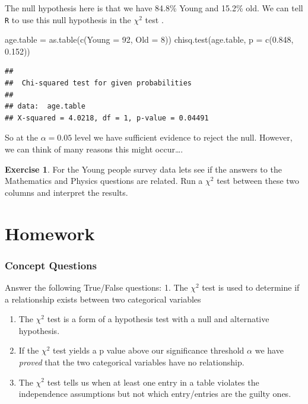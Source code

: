 \documentclass[
]{book}
\newenvironment{Shaded}{\begin{snugshade}}{\end{snugshade}}
\newcommand{\AttributeTok}[1]{\textcolor[rgb]{0.77,0.63,0.00}{#1}}
\newcommand{\DecValTok}[1]{\textcolor[rgb]{0.00,0.00,0.81}{#1}}
\newcommand{\FloatTok}[1]{\textcolor[rgb]{0.00,0.00,0.81}{#1}}
\newcommand{\FunctionTok}[1]{\textcolor[rgb]{0.00,0.00,0.00}{#1}}
\newcommand{\NormalTok}[1]{#1}
\newcommand{\OtherTok}[1]{\textcolor[rgb]{0.56,0.35,0.01}{#1}}
\theoremstyle{definition}
\theoremstyle{definition}
\theoremstyle{definition}
\newtheorem{exercise}{Exercise}[chapter]
\theoremstyle{definition}
\theoremstyle{remark}
\begin{document}
The null hypothesis here is that we have 84.8\% Young and 15.2\% old. We can tell \texttt{R} to use this null hypothesis in the \(\chi^2\) test .

\begin{Shaded}
\begin{Highlighting}[]
\NormalTok{age.table }\OtherTok{=} \FunctionTok{as.table}\NormalTok{(}\FunctionTok{c}\NormalTok{(}\AttributeTok{Young =} \DecValTok{92}\NormalTok{, }\AttributeTok{Old =} \DecValTok{8}\NormalTok{))}
\FunctionTok{chisq.test}\NormalTok{(age.table, }\AttributeTok{p =} \FunctionTok{c}\NormalTok{(}\FloatTok{0.848}\NormalTok{, }\FloatTok{0.152}\NormalTok{))}
\end{Highlighting}
\end{Shaded}

\begin{verbatim}
## 
##  Chi-squared test for given probabilities
## 
## data:  age.table
## X-squared = 4.0218, df = 1, p-value = 0.04491
\end{verbatim}

So at the \(\alpha=0.05\) level we have sufficient evidence to reject the null. However, we can think of many reasons this might occur\ldots.

\begin{exercise}
\protect\hypertarget{exr:unnamed-chunk-600}{}\label{exr:unnamed-chunk-600}For the Young people survey data lets see if the answers to the Mathematics and Physics questions are related. Run a \(\chi^2\) test between these two columns and interpret the results.
\end{exercise}

\hypertarget{homework-14}{%
\section{Homework}\label{homework-14}}

\hypertarget{concept-questions-13}{%
\subsubsection{Concept Questions}\label{concept-questions-13}}

Answer the following True/False questions:
1. The \(\chi^2\) test is used to determine if a relationship exists between two categorical variables

\begin{enumerate}
\def\labelenumi{\arabic{enumi}.}
\setcounter{enumi}{1}
\item
  The \(\chi^2\) test is a form of a hypothesis test with a null and alternative hypothesis.
\item
  If the \(\chi^2\) test yields a p value above our significance threshold \(\alpha\) we have \emph{proved} that the two categorical variables have no relationship.
\item
  The \(\chi^2\) test tells us when at least one entry in a table violates the independence assumptions but not which entry/entries are the guilty ones.
\end{enumerate}
\end{document}
